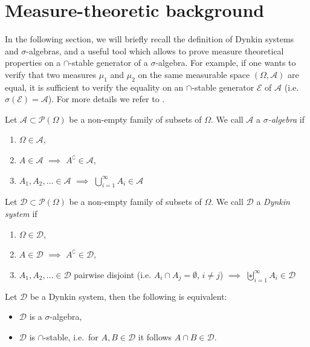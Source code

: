 \documentclass[12pt,openany]{book}
\theoremstyle{definition}
\theoremstyle{definition}
\newcommand{\cA}{\mathcal{A}}
\newcommand{\cD}{\mathcal{D}}
\newcommand{\cE}{\mathcal{E}}
\newcommand{\cP}{\mathcal{P}}
\begin{document}
\section{Measure-theoretic background}\label{app:measuretheory}
In the following section, we will briefly recall the definition of Dynkin systems and $\sigma$-algebras, and a useful tool which allows to prove measure theoretical properties on a $\cap$-stable generator of a $\sigma$-algebra. For example, if one wants to verify that two measures $\mu_1$ and $\mu_2$ on the same measurable space $(\Omega,\mathcal A)$ are equal, it is sufficient to verify the equality on an $\cap$-stable generator $\cE$ of $\mathcal A$ (i.e.~$\sigma(\cE)=\cA$). For more details we refer to \cite[Section~1]{klenke}.

\begin{defi}
Let $\cA\subset \cP(\Omega)$ be a non-empty family of subsets of $\Omega$. We call $\cA$ a \textit{$\sigma$-algebra} if
\begin{enumerate}
\item $\Omega\in\cA$,
\item $A\in\cA$ $\implies$ $A^\complement\in\cA$,
\item $A_1,A_2,\dots \in\cA$ $\implies$ $\bigcup\limits_{i=1}^\infty A_i \in\cA$
\end{enumerate}
\end{defi}

\begin{defi}
Let $\cD\subset \cP(\Omega)$ be a non-empty family of subsets of $\Omega$. We call $\cD$ a \textit{Dynkin system} if
\begin{enumerate}
\item $\Omega\in\cD$,
\item $A\in\cD$ $\implies$ $A^\complement\in\cD$,
\item $A_1,A_2,\dots \in\cD$ pairwise disjoint (i.e. $A_i\cap A_j = \emptyset$, $i\neq j$)  $\implies$ $\biguplus\limits_{i=1}^\infty A_i \in\cD$
\end{enumerate}
\end{defi}

\begin{prop}
Let $\cD$ be a Dynkin system, then the following is equivalent:
\begin{itemize}
\item $\cD$ is a $\sigma$-algebra,
\item $\cD$ is $\cap$-stable, i.e.~for $A,B\in\cD$ it follows $A\cap B\in\cD$.
\end{itemize} 
\end{prop}
\end{document}
